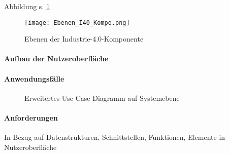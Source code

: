 Abbildung s. \ref{ebenen_i40}

\begin{figure}[h]
  \centering
  \texttt{[image: Ebenen\_I40\_Kompo.png]}
  \caption[Ebenen der Industrie-4.0-Komponente]{Ebenen der Industrie-4.0-Komponente \citep[S. 52]{BITKOM2015}}
  \label{ebenen_i40}
\end{figure}

\paragraph{Aufbau der Nutzeroberfläche}
\paragraph{Anwendungsfälle}

\begin{figure}[ht!]
  \centering
  \noindent{}
  \caption[Erweitertes Use Case Diagramm auf Systemebene]{Erweitertes Use Case Diagramm auf Systemebene}
  \label{usecasediagram}
\end{figure}
\paragraph{Anforderungen}

In Bezug auf Datenstrukturen, Schnittstellen, Funktionen, Elemente in Nutzeroberfläche

